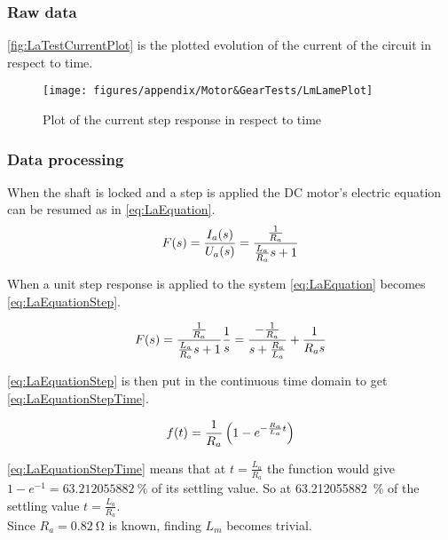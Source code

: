\subsubsection*{Raw data}
\autoref{fig:LaTestCurrentPlot} is the plotted evolution of the current of the circuit in respect to time.

\begin{figure}[htbp]
	\centering
	\texttt{[image: figures/appendix/Motor\&GearTests/LmLamePlot]}
	\caption{Plot of the current step response in respect to time}\label{fig:LaTestCurrentPlot}
\end{figure}

\subsubsection*{Data processing}
When the shaft is locked and a step is applied the DC motor's electric equation can be resumed as in \autoref{eq:LaEquation}.
\begin{equation}
	F(s)=\frac{I_a(s)}{U_a(s)}=\frac{\frac{1}{R_a}}{\frac{L_a}{R_a} s+1} \addunit{1}
	\label{eq:LaEquation}
\end{equation}
\startexplain
{}
\stopexplain

When a unit step response is applied to the system \autoref{eq:LaEquation} becomes \autoref{eq:LaEquationStep}.

\begin{equation}
F(s)=\frac{\frac{1}{R_a}}{\frac{L_a}{R_a} s+1}\frac{1}{s}=\frac{-\frac{1}{R_a}}{s+\frac{R_a}{L_a}}+\frac{1}{R_a s} \addunit{1}
\label{eq:LaEquationStep}
\end{equation}

\autoref{eq:LaEquationStep} is then put in the continuous time domain to get \autoref{eq:LaEquationStepTime}.

\begin{equation}
f(t)= \frac{1}{R_a} \left(1-e^{-\frac{R_a}{L_a} t}\right) \addunit{1}
\label{eq:LaEquationStepTime}
\end{equation}

\autoref{eq:LaEquationStepTime} means that at $t=\frac{L_a}{R_a}$ the function would give $1-e^{-1}=\SI{63.212055882}{\percent}$ of its settling value. So at \SI{63.212055882}{\percent} of the settling value $t=\frac{L_a}{R_a}$. \\
Since $R_a=\SI{0.82}{\ohm}$ is known, finding $L_m$ becomes trivial.

